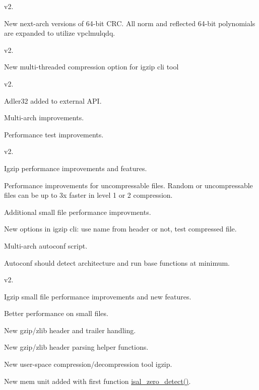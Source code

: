 v2.


\begin{DoxyItemize}
\item New next-\/arch versions of 64-\/bit C\-R\-C. All norm and reflected 64-\/bit polynomials are expanded to utilize vpclmulqdq.
\end{DoxyItemize}

v2.


\begin{DoxyItemize}
\item New multi-\/threaded compression option for igzip cli tool
\end{DoxyItemize}

v2.


\begin{DoxyItemize}
\item Adler32 added to external A\-P\-I.
\item Multi-\/arch improvements.
\item Performance test improvements.
\end{DoxyItemize}

v2.


\begin{DoxyItemize}
\item Igzip performance improvements and features.
\begin{DoxyItemize}
\item Performance improvements for uncompressable files. Random or uncompressable files can be up to 3x faster in level 1 or 2 compression.
\item Additional small file performance improvments.
\item New options in igzip cli\-: use name from header or not, test compressed file.
\end{DoxyItemize}
\item Multi-\/arch autoconf script.
\begin{DoxyItemize}
\item Autoconf should detect architecture and run base functions at minimum.
\end{DoxyItemize}
\end{DoxyItemize}

v2.


\begin{DoxyItemize}
\item Igzip small file performance improvements and new features.
\begin{DoxyItemize}
\item Better performance on small files.
\item New gzip/zlib header and trailer handling.
\item New gzip/zlib header parsing helper functions.
\item New user-\/space compression/decompression tool igzip.
\end{DoxyItemize}
\item New mem unit added with first function \hyperlink{mem__routines_8h_a55bf74827e07e1a13ff283ae64d1c55d}{isal\-\_\-zero\-\_\-detect()}.
\end{DoxyItemize}

